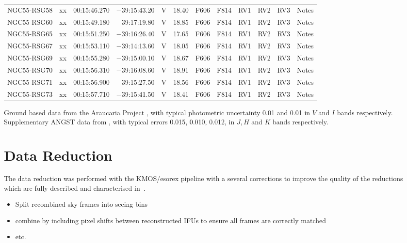 \begin{table}
\begin{threeparttable}
\begin{tabular}{lrcccccccccl}
NGC55-RSG58 & xx & 00:15:46.270 & $-$39:15:43.20& V & 18.40 & F606 & F814 & RV1 & RV2 & RV3 & Notes\\
NGC55-RSG60 & xx & 00:15:49.180 & $-$39:17:19.80& V & 18.85 & F606 & F814 & RV1 & RV2 & RV3 & Notes\\
NGC55-RSG65 & xx & 00:15:51.250 & $-$39:16:26.40& V & 17.65 & F606 & F814 & RV1 & RV2 & RV3 & Notes\\
NGC55-RSG67 & xx & 00:15:53.110 & $-$39:14:13.60& V & 18.05 & F606 & F814 & RV1 & RV2 & RV3 & Notes\\
NGC55-RSG69 & xx & 00:15:55.280 & $-$39:15:00.10& V & 18.67 & F606 & F814 & RV1 & RV2 & RV3 & Notes\\
NGC55-RSG70 & xx & 00:15:56.310 & $-$39:16:08.60& V & 18.91 & F606 & F814 & RV1 & RV2 & RV3 & Notes\\
NGC55-RSG71 & xx & 00:15:56.900 & $-$39:15:27.50& V & 18.56 & F606 & F814 & RV1 & RV2 & RV3 & Notes\\
NGC55-RSG73 & xx & 00:15:57.710 & $-$39:15:41.50& V & 18.41 & F606 & F814 & RV1 & RV2 & RV3 & Notes\\
\hline
\end{tabular}
\begin{tablenotes}
  \item Ground based data from the Araucaria Project
  \protect\cite{2006AJ....132.2556P}, with typical photometric uncertainty 0.01 and 0.01 in $V$ and $I$ bands respectively.
  Supplementary ANGST data from
  \protect\cite{2009ApJS..183...67D}, with typical errors 0.015, 0.010, 0.012, in $J, H$ and $K$ bands respectively.
\end{tablenotes}
\end{threeparttable}
\end{table}



\section{Data Reduction} %
\label{sec:data_reduction}

The data reduction was performed with the KMOS/esorex pipeline with a several corrections to improve the quality of the reductions which are fully described and characterised in~\cite{Turner-prep}.

\begin{itemize}
    \item Split recombined sky frames into seeing bins
    \item combine by including pixel shifts between reconstructed IFUs to ensure all frames are correctly matched
    \item etc.
\end{itemize}


